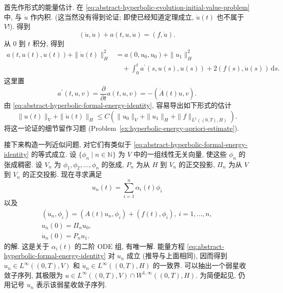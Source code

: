 首先作形式的能量估计. 在 \eqref{eq:abstract-hyperbolic-evolution-initial-value-problem} 中, 与 $\dot u$ 作内积. (这当然没有得到论证; 即使已经知道定理成立, $\dot u(t)$ 也不属于 $V$!). 得到
\begin{equation}\label{eq:abstract-hyperbolic-formal-energy-pairing}
(\ddot u,\dot u)+a(t,u,\dot u)=(f,\dot u).
\end{equation}
从 0 到 $t$ 积分, 得到
\begin{equation}\label{eq:abstract-hyperbolic-formal-energy-identity}
\begin{aligned}a(t,u(t),u(t))+\|\dot u(t)\|_H^2&=a(0,u_0,u_0)+\|u_1\|_H^2\\&\quad+\int_0^t a^{\prime}(s,u(s),u(s))+2(f(s),\dot u(s))\,\mathrm{d}s.\end{aligned}
\end{equation}
这里置
\begin{equation}\label{eq:abstract-hyperbolic-time-derivative-quadratic-form}
a^{\prime}(t,u,v)=\dfrac{\partial}{\partial t}a(t,u,v)=-(\dot A(t)u,v).
\end{equation}
由 \eqref{eq:abstract-hyperbolic-formal-energy-identity}, 容易导出如下形式的估计
\begin{equation}\label{eq:abstract-hyperbolic-solution-apriori-bound}
\|u(t)\|_V+\|\dot u(t)\|_H\leq C(\|u_0\|_V+\|u_1\|_H+\|f\|_{L^1((0,T),H)}).
\end{equation}
将这一论证的细节留作习题 (Problem~\ref{ex:hyperbolic-energy-apriori-estimate}).

接下来构造一列近似问题, 对它们有类似于 \eqref{eq:abstract-hyperbolic-formal-energy-identity} 的等式成立. 设 $\{\phi_n\mid n\in\mathbb{N}\}$ 为 $V$ 中的一组线性无关向量, 使这些 $\phi_n$ 的张成稠密. 设 $V_n$ 为 $\phi_1,\phi_2,\ldots,\phi_n$ 的张成, $P_n$ 为从 $H$ 到 $V_n$ 的正交投影, $\Pi_n$ 为从 $V$ 到 $V_n$ 的正交投影. 现在寻求满足
\begin{equation}\label{eq:abstract-hyperbolic-galerkin-finite-span-solution}
u_n(t)=\sum_{i=1}^n\alpha_i(t)\phi_i
\end{equation}
以及
\begin{equation}\label{eq:abstract-hyperbolic-galerkin-initial-value-system}
\begin{gathered}(\ddot u_n,\phi_i)=(A(t)u_n,\phi_i)+(f(t),\phi_i),\ i=1,\ldots,n,\\u_n(0)=\Pi_nu_0,\\\dot u_n(0)=P_nu_1.\end{gathered}
\end{equation}
的解. 这是关于 $\alpha_i(t)$ 的二阶 ODE 组, 有唯一解. 能量方程 \eqref{eq:abstract-hyperbolic-formal-energy-identity} 对 $u_n$ 成立 (推导与上面相同), 因而得到 $u_n\in L^\infty((0,T),V)$ 和 $\dot u_n\in L^\infty((0,T),H)$ 的一致界. 可以抽出一个弱星收敛子序列, 其极限为 $u\in L^\infty((0,T),V)\cap W^{1,\infty}((0,T),H)$. 为简便起见, 仍用记号 $u_n$ 表示该弱星收敛子序列.

